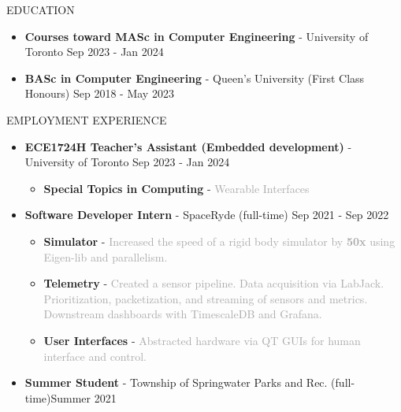 \documentclass{resume} %
\begin{document}
\begin{rSection}{EDUCATION}
    \begin{itemize}
        \item {\bf Courses toward MASc in Computer Engineering} - University of Toronto \hfill {Sep 2023 - Jan 2024}
    \end{itemize}
    \begin{itemize}
        \item {\bf BASc in Computer Engineering} - Queen's University (First Class Honours) \hfill {Sep 2018 - May 2023}
    \end{itemize}
\end{rSection}

\begin{rSection}{EMPLOYMENT EXPERIENCE}
    \begin{itemize}
        \item {\bf ECE1724H Teacher's Assistant (Embedded development)} - University of Toronto \hfill {Sep 2023 - Jan 2024}
        \begin{itemize}[topsep=-10pt]
            \setlength\itemsep{-0.5em}
                \item[\textbullet] {\bf Special Topics in Computing} - \textcolor{darkgray}{Wearable Interfaces}
            \end{itemize}
        \item {\bf Software Developer Intern} - SpaceRyde (full-time) \hfill {Sep 2021 - Sep 2022}
        \begin{itemize}[topsep=-10pt]
            \setlength\itemsep{-0.5em}
            \item[\textbullet] {\bf Simulator} - \textcolor{darkgray}{Increased the speed of a rigid body simulator by \textbf{50x} using Eigen-lib and parallelism.}
            \item[\textbullet] {\bf Telemetry} - \textcolor{darkgray}{Created a sensor pipeline. Data acquisition via LabJack. Prioritization, packetization, and streaming of sensors and metrics. Downstream dashboards with TimescaleDB and Grafana.}
            \item[\textbullet] {\bf User Interfaces} - \textcolor{darkgray}{Abstracted hardware via QT GUIs for human interface and control.}
        \end{itemize}
        \item {\bf Summer Student} - Township of Springwater Parks and Rec. (full-time)\hfill {Summer 2021}
        \begin{itemize}[topsep=-10pt]
            \setlength\itemsep{-0.5em}

\end{itemize}
\end{itemize}
\end{rSection}
\end{document}
